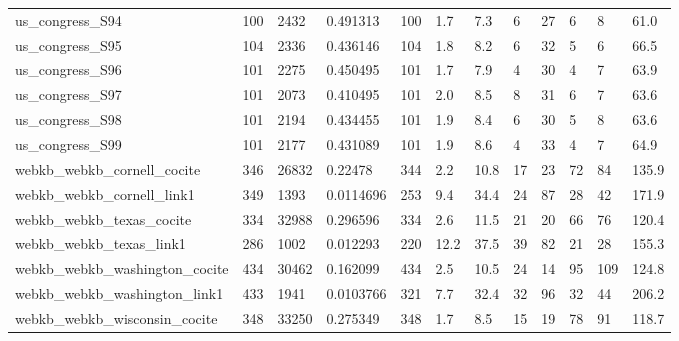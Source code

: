 \begin{longtable}{llllllllllll}
 us\_congress\_S94                                    & 100        & 2432      & 0.491313    & 100   & 1.7    & 7.3    & 6     & 27     & 6      & 8      & 61.0    \\
 us\_congress\_S95                                    & 104        & 2336      & 0.436146    & 104   & 1.8    & 8.2    & 6     & 32     & 5      & 6      & 66.5    \\
 us\_congress\_S96                                    & 101        & 2275      & 0.450495    & 101   & 1.7    & 7.9    & 4     & 30     & 4      & 7      & 63.9    \\
 us\_congress\_S97                                    & 101        & 2073      & 0.410495    & 101   & 2.0    & 8.5    & 8     & 31     & 6      & 7      & 63.6    \\
 us\_congress\_S98                                    & 101        & 2194      & 0.434455    & 101   & 1.9    & 8.4    & 6     & 30     & 5      & 8      & 63.6    \\
 us\_congress\_S99                                    & 101        & 2177      & 0.431089    & 101   & 1.9    & 8.6    & 4     & 33     & 4      & 7      & 64.9    \\
 webkb\_webkb\_cornell\_cocite                         & 346        & 26832     & 0.22478     & 344   & 2.2    & 10.8   & 17    & 23     & 72     & 84     & 135.9   \\
 webkb\_webkb\_cornell\_link1                          & 349        & 1393      & 0.0114696   & 253   & 9.4    & 34.4   & 24    & 87     & 28     & 42     & 171.9   \\
 webkb\_webkb\_texas\_cocite                           & 334        & 32988     & 0.296596    & 334   & 2.6    & 11.5   & 21    & 20     & 66     & 76     & 120.4   \\
 webkb\_webkb\_texas\_link1                            & 286        & 1002      & 0.012293    & 220   & 12.2   & 37.5   & 39    & 82     & 21     & 28     & 155.3   \\
 webkb\_webkb\_washington\_cocite                      & 434        & 30462     & 0.162099    & 434   & 2.5    & 10.5   & 24    & 14     & 95     & 109    & 124.8   \\
 webkb\_webkb\_washington\_link1                       & 433        & 1941      & 0.0103766   & 321   & 7.7    & 32.4   & 32    & 96     & 32     & 44     & 206.2   \\
 webkb\_webkb\_wisconsin\_cocite                       & 348        & 33250     & 0.275349    & 348   & 1.7    & 8.5    & 15    & 19     & 78     & 91     & 118.7   \\

\end{longtable}
